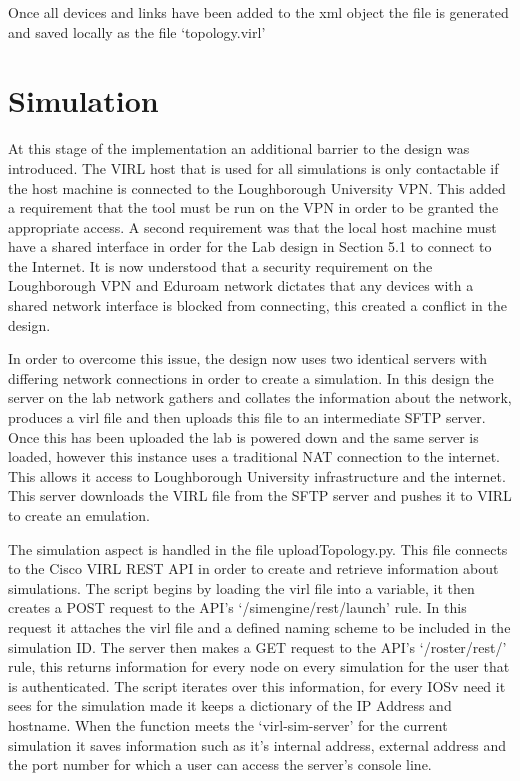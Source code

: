 \documentclass[11pt]{report}
\begin{document}
Once all devices and links have been added to the xml object the file is generated and saved locally as the file `topology.virl'

\section{Simulation}

At this stage of the implementation an additional barrier to the design was introduced. The VIRL host that is used for all simulations is only contactable if the host machine is connected to the Loughborough University VPN. This added a requirement that the tool must be run on the VPN in order to be granted the appropriate access. A second requirement was that the local host machine must have a shared interface in order for the Lab design in Section 5.1 to connect to the Internet. It is now understood that a security requirement on the Loughborough VPN and Eduroam network dictates that any devices with a shared network interface is blocked from connecting, this created a conflict in the design.

In order to overcome this issue, the design now uses two identical servers with differing network connections in order to create a simulation. In this design the server on the lab network gathers and collates the information about the network, produces a virl file and then uploads this file to an intermediate SFTP server. Once this has been uploaded the lab is powered down and the same server is loaded, however this instance uses a traditional NAT connection to the internet. This allows it access to Loughborough University infrastructure and the internet. This server downloads the VIRL file from the SFTP server and pushes it to VIRL to create an emulation.

The simulation aspect is handled in the file uploadTopology.py. This file connects to the Cisco VIRL REST API in order to create and retrieve information about simulations. The script begins by loading the virl file into a variable, it then creates a POST request to the API's `/simengine/rest/launch' rule. In this request it attaches the virl file and a defined naming scheme to be included in the simulation ID. The server then makes a GET request to the API's `/roster/rest/' rule, this returns information for every node on every simulation for the user that is authenticated. The script iterates over this information, for every IOSv need it sees for the simulation made it keeps a dictionary of the IP Address and hostname. When the function meets the `virl-sim-server' for the current simulation it saves information such as it's internal address, external address and the port number for which a user can access the server's console line.
\end{document}
